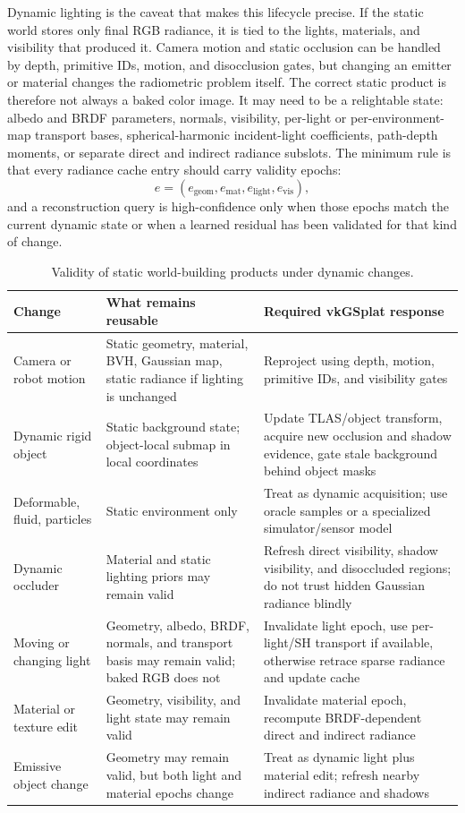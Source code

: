 \documentclass[10pt,journal,onecolumn]{IEEEtran}
\begin{document}
Dynamic lighting is the caveat that makes this lifecycle precise. If the static
world stores only final RGB radiance, it is tied to the lights, materials, and
visibility that produced it. Camera motion and static occlusion can be handled
by depth, primitive IDs, motion, and disocclusion gates, but changing an emitter
or material changes the radiometric problem itself. The correct static product
is therefore not always a baked color image. It may need to be a relightable
state: albedo and BRDF parameters, normals, visibility, per-light or
per-environment-map transport bases, spherical-harmonic incident-light
coefficients, path-depth moments, or separate direct and indirect radiance
subslots. The minimum rule is that every radiance cache entry should carry
validity epochs:
\[
  e = (e_{\mathrm{geom}}, e_{\mathrm{mat}}, e_{\mathrm{light}}, e_{\mathrm{vis}}),
\]
and a reconstruction query is high-confidence only when those epochs match the
current dynamic state or when a learned residual has been validated for that
kind of change.

\begin{table}[t]
\centering
\footnotesize
\caption{Validity of static world-building products under dynamic changes.}
\label{tab:dynamic-validity}
\begin{tabular}{p{}p{}p{}}
\toprule
\textbf{Change} & \textbf{What remains reusable} & \textbf{Required vkGSplat response} \\
\midrule
Camera or robot motion & Static geometry, material, BVH, Gaussian map, static radiance if lighting is unchanged & Reproject using depth, motion, primitive IDs, and visibility gates \\
Dynamic rigid object & Static background state; object-local submap in local coordinates & Update TLAS/object transform, acquire new occlusion and shadow evidence, gate stale background behind object masks \\
Deformable, fluid, particles & Static environment only & Treat as dynamic acquisition; use oracle samples or a specialized simulator/sensor model \\
Dynamic occluder & Material and static lighting priors may remain valid & Refresh direct visibility, shadow visibility, and disoccluded regions; do not trust hidden Gaussian radiance blindly \\
Moving or changing light & Geometry, albedo, BRDF, normals, and transport basis may remain valid; baked RGB does not & Invalidate light epoch, use per-light/SH transport if available, otherwise retrace sparse radiance and update cache \\
Material or texture edit & Geometry, visibility, and light state may remain valid & Invalidate material epoch, recompute BRDF-dependent direct and indirect radiance \\
Emissive object change & Geometry may remain valid, but both light and material epochs change & Treat as dynamic light plus material edit; refresh nearby indirect radiance and shadows \\
\bottomrule
\end{tabular}
\end{table}
\end{document}
